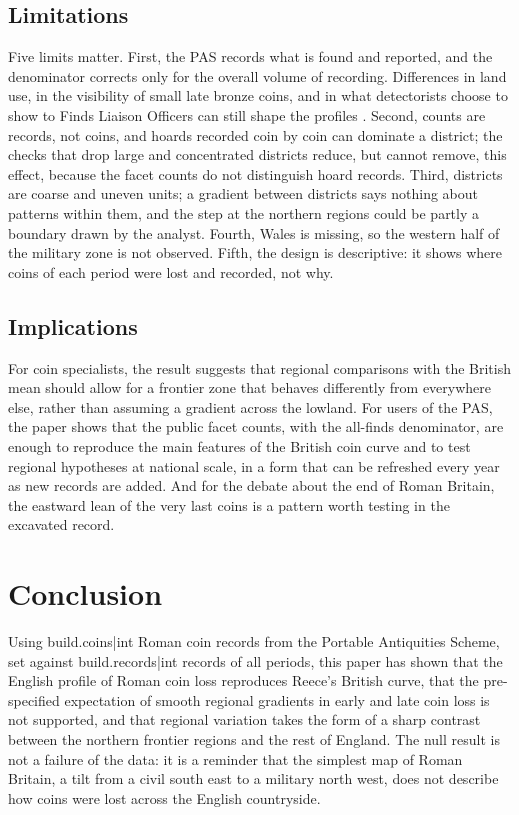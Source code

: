 \documentclass[11pt,a4paper]{article}
\begin{document}
\subsection{Limitations}
Five limits matter. First, the PAS records what is found and reported, and the denominator corrects only for the overall volume of recording. Differences in land use, in the visibility of small late bronze coins, and in what detectorists choose to show to Finds Liaison Officers can still shape the profiles \citep{robbins2012,robbins2013}. Second, counts are records, not coins, and hoards recorded coin by coin can dominate a district; the checks that drop large and concentrated districts reduce, but cannot remove, this effect, because the facet counts do not distinguish hoard records. Third, districts are coarse and uneven units; a gradient between districts says nothing about patterns within them, and the step at the northern regions could be partly a boundary drawn by the analyst. Fourth, Wales is missing, so the western half of the military zone is not observed. Fifth, the design is descriptive: it shows where coins of each period were lost and recorded, not why.

\subsection{Implications}
For coin specialists, the result suggests that regional comparisons with the British mean should allow for a frontier zone that behaves differently from everywhere else, rather than assuming a gradient across the lowland. For users of the PAS, the paper shows that the public facet counts, with the all-finds denominator, are enough to reproduce the main features of the British coin curve and to test regional hypotheses at national scale, in a form that can be refreshed every year as new records are added. And for the debate about the end of Roman Britain, the eastward lean of the very last coins is a pattern worth testing in the excavated record.

\section{Conclusion}\label{sec:conc}
Using {{build.coins|int}} Roman coin records from the Portable Antiquities Scheme, set against {{build.records|int}} records of all periods, this paper has shown that the English profile of Roman coin loss reproduces Reece's British curve, that the pre-specified expectation of smooth regional gradients in early and late coin loss is not supported, and that regional variation takes the form of a sharp contrast between the northern frontier regions and the rest of England. The null result is not a failure of the data: it is a reminder that the simplest map of Roman Britain, a tilt from a civil south east to a military north west, does not describe how coins were lost across the English countryside.
\end{document}
